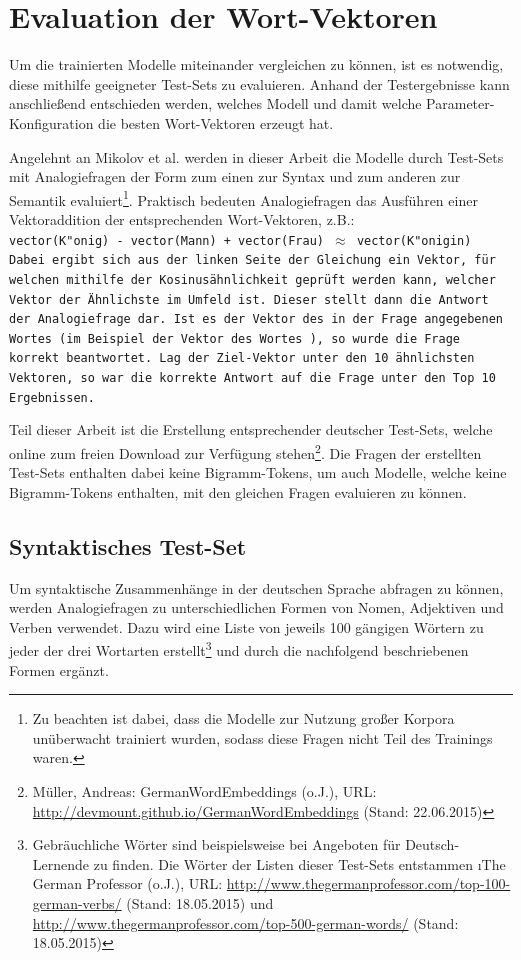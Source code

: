 \section{Evaluation der Wort-Vektoren}\label{s.evaluation}
Um die trainierten Modelle miteinander vergleichen zu können, ist es notwendig, diese mithilfe geeigneter Test-Sets zu evaluieren. Anhand der Testergebnisse kann anschließend entschieden werden, welches Modell und damit welche Parameter-Konfiguration die besten Wort-Vektoren erzeugt hat.

Angelehnt an Mikolov et al. \citep{Mikolov2012} werden in dieser Arbeit die Modelle durch Test-Sets mit Analogiefragen der Form  zum einen zur Syntax und zum anderen zur Semantik evaluiert\footnote{Zu beachten ist dabei, dass die Modelle zur Nutzung großer Korpora unüberwacht trainiert wurden, sodass diese Fragen nicht Teil des Trainings waren.}. Praktisch bedeuten Analogiefragen das Ausführen einer Vektoraddition der entsprechenden Wort-Vektoren, z.B.:\\
\tt{vector(K"onig) - vector(Mann) + vector(Frau) $\approx$ vector(K"onigin)}\\
Dabei ergibt sich aus der linken Seite der Gleichung ein Vektor, für welchen mithilfe der Kosinusähnlichkeit geprüft werden kann, welcher Vektor der Ähnlichste im Umfeld ist. Dieser stellt dann die Antwort der Analogiefrage dar. Ist es der Vektor des in der Frage angegebenen Wortes (im Beispiel der Vektor des Wortes ), so wurde die Frage korrekt beantwortet. Lag der Ziel-Vektor unter den 10 ähnlichsten Vektoren, so war die korrekte Antwort auf die Frage unter den Top 10 Ergebnissen.

Teil dieser Arbeit ist die Erstellung entsprechender deutscher Test-Sets, welche online zum freien Download zur Verfügung stehen\footnote{Müller, Andreas: GermanWordEmbeddings (o.J.), URL: \url{http://devmount.github.io/GermanWordEmbeddings} (Stand: 22.06.2015)}. Die Fragen der erstellten Test-Sets enthalten dabei keine Bigramm-Tokens, um auch Modelle, welche keine Bigramm-Tokens enthalten, mit den gleichen Fragen evaluieren zu können.

\subsection{Syntaktisches Test-Set}\label{ss.syntactictestset}
Um syntaktische Zusammenhänge in der deutschen Sprache abfragen zu können, werden Analogiefragen zu unterschiedlichen Formen von Nomen, Adjektiven und Verben verwendet. Dazu wird eine Liste von jeweils 100 gängigen Wörtern zu jeder der drei Wortarten erstellt\footnote{Gebräuchliche Wörter sind beispielsweise bei Angeboten für Deutsch-Lernende zu finden. Die Wörter der Listen dieser Test-Sets entstammen \i{The German Professor} (o.J.), URL: \url{http://www.thegermanprofessor.com/top-100-german-verbs/} (Stand: 18.05.2015) und \url{http://www.thegermanprofessor.com/top-500-german-words/} (Stand: 18.05.2015)} und durch die nachfolgend beschriebenen Formen ergänzt.

